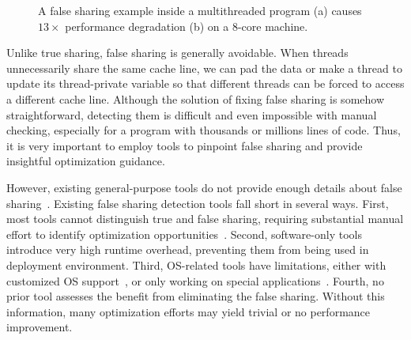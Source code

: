 \begin{figure}[htbp]
\centering
{}%
\hspace{20pt}
\caption{
A false sharing example inside a multithreaded program (a) causes $13\times$ performance degradation (b) on a 8-core machine.
\label{fig:penalty}}
\end{figure}


Unlike true sharing, false sharing is generally avoidable. When threads unnecessarily share the same cache line, we can pad the data or make a thread to update its thread-private variable so that different threads can be forced to access a different cache line. Although the solution of fixing false sharing is somehow straightforward, detecting them is difficult and even impossible with manual checking, especially for a program with thousands or millions lines of code. Thus, it is very important to employ tools to pinpoint false sharing and provide insightful optimization guidance.

However, existing general-purpose tools do not provide enough details about false sharing~\cite{gprof, ibs-sc, Intel:VTune}. Existing false sharing detection tools fall short in several ways. First, most tools cannot distinguish true and false sharing, requiring substantial manual effort to identify optimization opportunities~\cite{falseshare:binaryinstrumentation1,detect:ptu,detect:intel,falseshare:binaryinstrumentation2,DProf, qinzhao, OSdetection, mldetect, Wicaksono11detectingfalse, openmp}. Second, software-only tools~\cite{falseshare:binaryinstrumentation1,falseshare:binaryinstrumentation2,falseshare:simulator, Predator} introduce very high runtime overhead, preventing them from being used in deployment environment. Third, OS-related tools have limitations, either with customized OS support~\cite{OSdetection}, or only working on special applications~\cite{Sheriff}. Fourth, no prior tool assesses the benefit from eliminating the false sharing. Without this information, many optimization efforts may yield trivial or no performance improvement.

